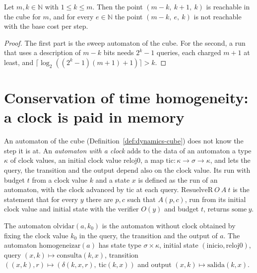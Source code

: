 \begin{theorem}
  \label{thm:dynamics-cube-not-enough}
  \leanok
  Let $m, k \in \mathbb{N}$ with $1 \le k \le m$. Then the point $(m-k,\ k+1,\ k)$ is reachable in
  the cube for $m$, and for every $e \in \mathbb{N}$ the point $(m-k,\ e,\ k)$ is not reachable
  with the base cost per step.
  \own{}
\end{theorem}

\begin{proof}
  \leanok
  The first part is the sweep automaton of the cube. For the second, a run that uses a
  description of $m - k$ bits needs $2^k - 1$ queries, each charged $m + 1$ at least, and
  $\lceil \log_2 ((2^k - 1)(m+1) + 1) \rceil > k$.
\end{proof}

\section{Conservation of time homogeneity: a clock is paid in memory}
\label{sec:dynamics-clock}

An automaton of the cube (Definition~\ref{def:dynamics-cube}) does not know the step it is at. An
\emph{automaton with a clock} adds to the data of an automaton a type $\kappa$ of clock values, an
initial clock value $\mathrm{reloj0}$, a map $\mathrm{tic} : \kappa \to \sigma \to \kappa$, and lets
the query, the transition and the output depend also on the clock value. Its run with budget $t$
from a clock value $k$ and a state $x$ is defined as the run of an automaton, with the clock
advanced by $\mathrm{tic}$ at each query. $\mathrm{ResuelveR}\ O\ A\ t$ is the statement that for
every $y$ there are $p, c$ such that $A(p,c)$, run from its initial clock value and initial state
with the verifier $O(y)$ and budget $t$, returns $\mathrm{some}\ y$.

The automaton $\mathrm{olvidar}(a, k_0)$ is the automaton without clock obtained by fixing the
clock value $k_0$ in the query, the transition and the output of $a$. The automaton
$\mathrm{homogeneizar}(a)$ has state type $\sigma \times \kappa$, initial state
$(\mathrm{inicio}, \mathrm{reloj0})$, query $(x, k) \mapsto \mathrm{consulta}(k, x)$, transition
$((x, k), r) \mapsto (\delta(k, x, r),\ \mathrm{tic}(k, x))$ and output
$(x, k) \mapsto \mathrm{salida}(k, x)$.

